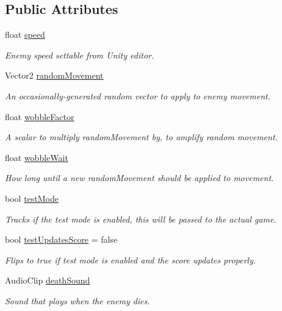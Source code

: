\subsection*{Public Attributes}
\begin{DoxyCompactItemize}
\item 
float \mbox{\hyperlink{class_enemy_behavior_a1c7f38d162cec582d736b2b7d7d0ac6b}{speed}}
\begin{DoxyCompactList}\small\item\em Enemy speed settable from Unity editor. \end{DoxyCompactList}\item 
Vector2 \mbox{\hyperlink{class_enemy_behavior_a6f9339ebbcc8c5ad4e538d52bfde73c1}{random\+Movement}}
\begin{DoxyCompactList}\small\item\em An occasionally-\/generated random vector to apply to enemy movement. \end{DoxyCompactList}\item 
float \mbox{\hyperlink{class_enemy_behavior_a80484f747dfb85a8063a50dd115f65e0}{wobble\+Factor}}
\begin{DoxyCompactList}\small\item\em A scalar to multiply random\+Movement by, to amplify random movement. \end{DoxyCompactList}\item 
float \mbox{\hyperlink{class_enemy_behavior_ade5bcff77085ea22523d28312c252d75}{wobble\+Wait}}
\begin{DoxyCompactList}\small\item\em How long until a new random\+Movement should be applied to movement. \end{DoxyCompactList}\item 
bool \mbox{\hyperlink{class_enemy_behavior_af8c760cde02386745dc1017af509049d}{test\+Mode}}
\begin{DoxyCompactList}\small\item\em Tracks if the test mode is enabled, this will be passed to the actual game. \end{DoxyCompactList}\item 
bool \mbox{\hyperlink{class_enemy_behavior_a45bada468af071f8ff4ff0f8b6d5a443}{test\+Updates\+Score}} = false
\begin{DoxyCompactList}\small\item\em Flips to true if test mode is enabled and the score updates properly. \end{DoxyCompactList}\item 
Audio\+Clip \mbox{\hyperlink{class_enemy_behavior_a82176ba450bef73880b2ff7db3123037}{death\+Sound}}
\begin{DoxyCompactList}\small\item\em Sound that plays when the enemy dies. \end{DoxyCompactList}\end{DoxyCompactItemize}


